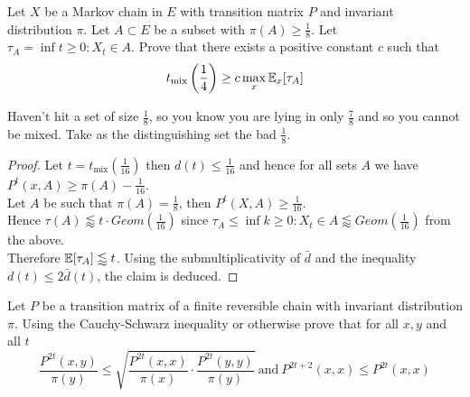\documentclass[a4paper]{article}
\newcommand{\tmix}{t_{\text{mix}}}
\begin{document}
\begin{question}[Question 7]
Let $X$ be a Markov chain in $E$ with transition matrix $P$ and invariant
distribution $\pi$. Let $A \subset E$ be a subset with $\pi(A) \geq
\frac{1}{8}$. Let $\tau_A = \inf{t \geq 0: X_t \in A}$. Prove that there exists
a positive constant $c$ such that
\[\tmix\left( \frac{1}{4} \right) \geq c \max_x \E_x[\tau_A]\]
\end{question}
\begin{idea}
  Haven't hit a set of size $\frac{1}{8}$, so you know you are lying in only
  $\frac{7}{8}$ and so you cannot be mixed. Take as the distinguishing set the
  bad $\frac{1}{8}$.
\end{idea}
\begin{proof}
  Let $t = \tmix\left( \frac{1}{16} \right)$ then $d(t) \leq \frac{1}{16}$ and
  hence for all sets $A$ we have $P^t(x, A) \geq \pi(A) - \frac{1}{16}$.\\
  Let $A$ be such that $\pi(A) = \frac{1}{8}$, then $P^t(X, A) \geq
  \frac{1}{16}$.\\
  Hence $\tau(A) \lessapprox t \cdot Geom \left( \frac{1}{16} \right)$ since
  $\tau_A \leq \inf{k \geq 0 : X_t \in A} \lessapprox Geom \left( \frac{1}{16}
  \right)$ from the above.\\
  Therefore $\E[\tau_A] \lessapprox t$. Using the submultiplicativity of
  $\bar{d}$ and the inequality $d(t) \leq 2\bar{d}(t)$, the claim is deduced.
  \end{proof}
\begin{question}[Question 13]
	Let $P$ be a transition matrix of a finite reversible chain with invariant distribution $\pi$. Using the Cauchy-Schwarz inequality or otherwise prove that for all $x,y$ and all $t$
	\[ \frac{P^{2t}(x, y)}{\pi (y)} \leq \sqrt{\frac{P^{2t}(x,x)}{\pi (x)} \cdot \frac{P^{2t}(y,y)}{\pi (y)}} \ \text{and} \ P^{2t+2}(x,x) \leq P^{2t} (x,x)\]
\end{question}
\end{document}

